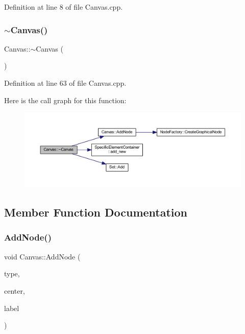 Definition at line 8 of file Canvas.\+cpp.

\mbox{\label{class_canvas_a237c4549ad2e27c729cd1f71e89f0fd9}} 
\subsubsection{\texorpdfstring{$\sim$\+Canvas()}{~Canvas()}}
{\footnotesize\ttfamily Canvas\+::$\sim$\+Canvas (\begin{DoxyParamCaption}{ }\end{DoxyParamCaption})}



Definition at line 63 of file Canvas.\+cpp.

Here is the call graph for this function\+:
\nopagebreak
\begin{figure}[H]
\begin{center}
\leavevmode
\includegraphics[width=350pt]{class_canvas_a237c4549ad2e27c729cd1f71e89f0fd9_cgraph}
\end{center}
\end{figure}


\subsection{Member Function Documentation}
\mbox{\label{class_canvas_aec9038762b17b62ff6126bd6277a9cd8}} 
\subsubsection{\texorpdfstring{Add\+Node()}{AddNode()}\hspace{0.1cm}{\footnotesize\ttfamily [1/2]}}
{\footnotesize\ttfamily void Canvas\+::\+Add\+Node (\begin{DoxyParamCaption}\item[{\hyperlink{class_generic_node_a9e7985ab9bbfa1c85091adc0ab71a6b6}{Generic\+Node\+::\+Type}}]{type,  }\item[{wx\+Point2\+D\+Double}]{center,  }\item[{const std\+::string \&}]{label }\end{DoxyParamCaption})}



